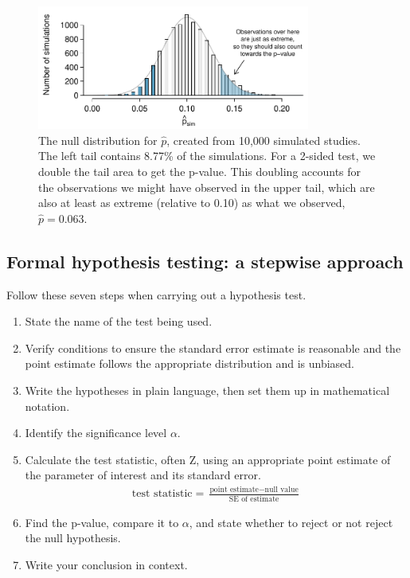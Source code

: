 \begin{figure}[ht]
\centering
\includegraphics[width=0.8\textwidth]{ch_inference_foundations/figures/MedicalConsultant/MedConsNullSim}
\caption{The null distribution for $\hat{p}$, created from 10,000 simulated studies. The left tail contains 8.77\% of the simulations. For a 2-sided test, we double the tail area to get the p-value. This doubling accounts for the observations we might have observed in the upper tail, which are also at least as extreme (relative to 0.10) as what we observed, $\hat{p} = 0.063$.}
\label{MedConsNullSim}
\end{figure}

\subsection{Formal hypothesis testing: a stepwise approach}

\begin{termBox}{
Follow these seven steps when carrying out a hypothesis test. 
\begin{enumerate}
\setlength{\itemsep}{0mm}
\item State the name of the test being used.
\item Verify conditions to ensure the standard error estimate is reasonable and the point estimate follows the appropriate distribution and is unbiased.
\item Write the hypotheses in plain language, then set them up in mathematical notation.
\item Identify the significance level $\alpha$.
\item Calculate the test statistic, often Z, using an appropriate point estimate of the parameter of interest and its standard error.\vspace{-1.5mm}
\begin{align*}
\text{test statistic} = \frac{\text{point estimate} - \text{null value}}{\text{SE of estimate}}
\end{align*}
\item Find the p-value, compare it to $\alpha$, and state whether to reject or not reject the null hypothesis.
\item Write your conclusion in context.
\end{enumerate}}
\end{termBox}

